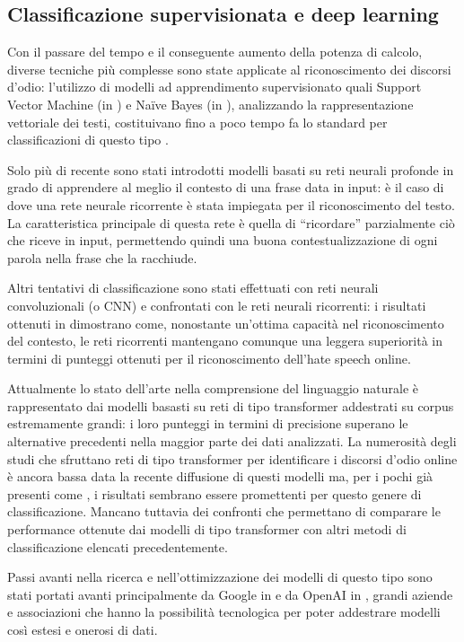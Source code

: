 \subsection{Classificazione supervisionata e deep learning}

Con il passare del tempo e il conseguente aumento della potenza di calcolo, diverse tecniche più complesse sono state applicate al riconoscimento dei discorsi d’odio: l’utilizzo di modelli ad apprendimento supervisionato quali Support Vector Machine (in \cite{WilliamHate}) e Naïve Bayes (in \cite{AmirNB}), analizzando la rappresentazione vettoriale dei testi, costituivano fino a poco tempo fa lo standard per classificazioni di questo tipo \cite{survey2}.

Solo più di recente sono stati introdotti modelli basati su reti neurali profonde in grado di apprendere al meglio il contesto di una frase data in input: è il caso di \cite{rnnabusive} dove una rete neurale ricorrente è stata impiegata per il riconoscimento del testo. La caratteristica principale di questa rete è quella di “ricordare” parzialmente ciò che riceve in input, permettendo quindi una buona contestualizzazione di ogni parola nella frase che la racchiude.

Altri tentativi di classificazione sono stati effettuati con reti neurali convoluzionali (o CNN) e confrontati con le reti neurali ricorrenti: i risultati ottenuti in \cite{CNNstudy} dimostrano come, nonostante un'ottima capacità nel riconoscimento del contesto, le reti ricorrenti mantengano comunque una leggera superiorità in termini di punteggi ottenuti per il riconoscimento dell’hate speech online.

Attualmente lo stato dell’arte nella comprensione del linguaggio naturale è rappresentato dai modelli basasti su reti di tipo transformer addestrati su corpus estremamente grandi: i loro punteggi in termini di precisione superano le alternative precedenti nella maggior parte dei dati analizzati. La numerosità degli studi che sfruttano reti di tipo transformer per identificare i discorsi d’odio online è ancora bassa data la recente diffusione di questi modelli ma, per i pochi già presenti come \cite{transformer1,transformer2}, i risultati sembrano essere promettenti per questo genere di classificazione. Mancano tuttavia dei confronti che permettano di comparare le performance ottenute dai modelli di tipo transformer con altri metodi di classificazione elencati precedentemente.

Passi avanti nella ricerca e nell'ottimizzazione dei modelli di questo tipo sono stati portati avanti principalmente da Google in \cite{Attention} e da OpenAI in \cite{brown2020language}, grandi aziende e associazioni che hanno la possibilità tecnologica per poter addestrare modelli così estesi e onerosi di dati.





